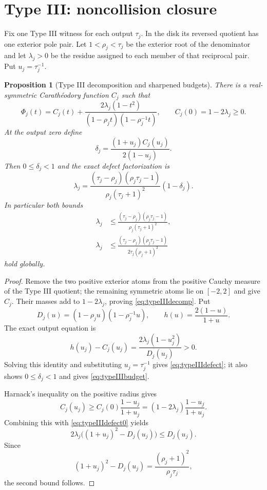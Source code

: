 \documentclass[11pt,reqno]{amsart}
\newtheorem{proposition}[theorem]{Proposition}
\theoremstyle{definition}
\theoremstyle{remark}
\begin{document}
\section{Type III: noncollision closure}

Fix one Type III witness for each output $\tau_j$.  In the disk its reversed
quotient has one exterior pole pair.  Let $1<\rho_j<\tau_j$ be the exterior
root of the denominator and let $\lambda_j>0$ be the residue assigned to
each member of that reciprocal pair.  Put $u_j=\tau_j^{-1}$.

\begin{proposition}[Type III decomposition and sharpened budgets]
\label{prop:IIIbudget}
There is a real-symmetric Carath\'eodory function $C_j$ such that
\begin{equation}\label{eq:typeIIIdecomp}
 \Phi_j(t)=C_j(t)+
 \frac{2\lambda_j(1-t^2)}
 {(1-\rho_jt)(1-\rho_j^{-1}t)},\qquad
 C_j(0)=1-2\lambda_j\ge0.
\end{equation}
At the output zero define
\[
 \delta_j=\frac{(1+u_j)C_j(u_j)}{2(1-u_j)}.
\]
Then $0\le\delta_j<1$ and the exact defect factorization is
\begin{equation}\label{eq:typeIIIdefect}
 \lambda_j=
 \frac{(\tau_j-\rho_j)(\rho_j\tau_j-1)}
 {\rho_j(\tau_j+1)^2}(1-\delta_j).
\end{equation}
In particular both bounds
\begin{align}
 \lambda_j&\le
 \frac{(\tau_j-\rho_j)(\rho_j\tau_j-1)}
 {\rho_j(\tau_j+1)^2},\label{eq:typeIIIbudget}\\
 \lambda_j&\le
 \frac{(\tau_j-\rho_j)(\rho_j\tau_j-1)}
 {2\tau_j(\rho_j+1)^2}\label{eq:typeIIIharnackbudget}
\end{align}
hold globally.
\end{proposition}

\begin{proof}
Remove the two positive exterior atoms from the positive Cauchy measure of
the Type III quotient; the remaining symmetric atoms lie on $[-2,2]$ and
give $C_j$.
Their masses add to $1-2\lambda_j$, proving \eqref{eq:typeIIIdecomp}.
Put
\[
 D_j(u)=(1-\rho_ju)(1-\rho_j^{-1}u),\qquad
 h(u)=\frac{2(1-u)}{1+u}.
\]
The exact output equation is
\begin{equation}\label{eq:typeIIIdefect0}
 h(u_j)-C_j(u_j)=
 \frac{2\lambda_j(1-u_j^2)}{D_j(u_j)}>0.
\end{equation}
Solving this identity and substituting $u_j=\tau_j^{-1}$ gives
\eqref{eq:typeIIIdefect}; it also shows $0\le\delta_j<1$ and gives
\eqref{eq:typeIIIbudget}.

Harnack's inequality on the positive radius gives
\[
 C_j(u_j)\ge C_j(0)\frac{1-u_j}{1+u_j}
 =(1-2\lambda_j)\frac{1-u_j}{1+u_j}.
\]
Combining this with \eqref{eq:typeIIIdefect0} yields
\[
 2\lambda_j\bigl((1+u_j)^2-D_j(u_j)\bigr)\le D_j(u_j).
\]
Since
\[
 (1+u_j)^2-D_j(u_j)=\frac{(\rho_j+1)^2}{\rho_j\tau_j},
\]
the second bound follows.
\end{proof}
\end{document}
